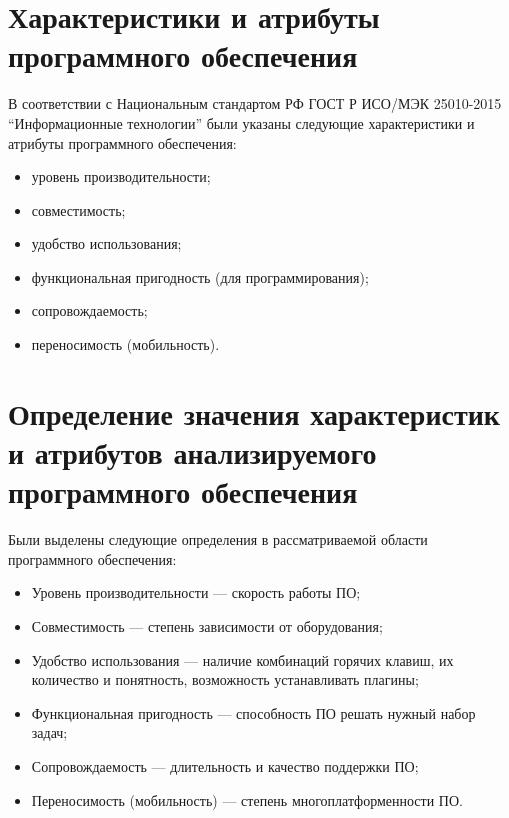 \section{Характеристики и атрибуты программного
	обеспечения}
В соответствии с Национальным стандартом РФ ГОСТ Р ИСО/МЭК 25010-2015
“Информационные технологии” были указаны следующие
характеристики и атрибуты программного обеспечения:
\begin{itemize}
	\item уровень производительности;
	\item совместимость;
	\item удобство использования;
	\item функциональная пригодность (для программирования);
	\item сопровождаемость;
	\item переносимость (мобильность).
\end{itemize}

\section[Определение занчений]{Определение значения характеристик
	и атрибутов анализируемого программного обеспечения}
Были выделены следующие определения в рассматриваемой области
программного обеспечения:
\begin{itemize}
	\item Уровень производительности --- скорость работы ПО;
	\item Совместимость --- степень зависимости от оборудования;
	\item Удобство использования --- наличие комбинаций горячих клавиш,
		их количество и понятность, возможность устанавливать плагины;
	\item Функциональная пригодность --- способность ПО решать нужный
		набор задач;
	\item Сопровождаемость --- длительность и качество поддержки ПО;
	\item Переносимость (мобильность) --- степень многоплатформенности ПО.
\end{itemize}

